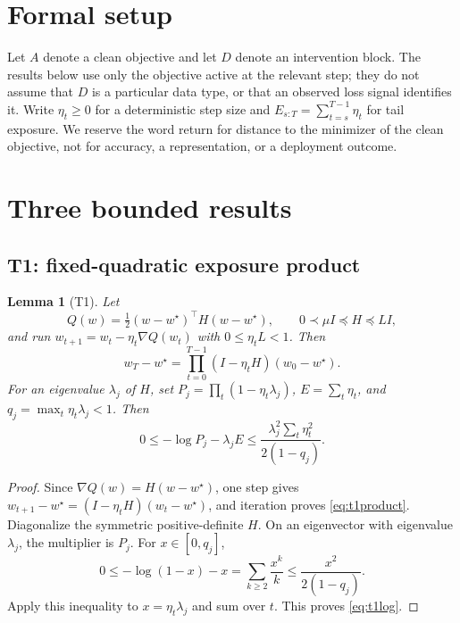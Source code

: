 \documentclass{article}
\newtheorem{lemma}{Lemma}
\begin{document}
\section{Formal setup}
\label{sec:setup}

Let $A$ denote a clean objective and let $D$ denote an intervention block.
The results below use only the objective active at the relevant step; they do
not assume that $D$ is a particular data type, or that an observed loss signal
identifies it. Write $\eta_t\geq0$ for a deterministic step size and
$E_{s:T}=\sum_{t=s}^{T-1}\eta_t$ for tail exposure. We reserve
the word return for distance to the minimizer of the clean objective, not for
accuracy, a representation, or a deployment outcome.

\section{Three bounded results}
\label{sec:theory}

\subsection{T1: fixed-quadratic exposure product}
\label{sec:t1}

\begin{lemma}[T1]
\label{thm:t1}
Let
\[
 Q(w)=\tfrac12(w-w^\star)^\top H(w-w^\star),\qquad
 0\prec\mu I\preceq H\preceq LI,
\]
and run $w_{t+1}=w_t-\eta_t\nabla Q(w_t)$ with
$0\leq\eta_tL<1$. Then
\begin{equation}
 w_T-w^\star=\prod_{t=0}^{T-1}(I-\eta_tH)(w_0-w^\star).
\label{eq:t1product}
\end{equation}
For an eigenvalue $\lambda_j$ of $H$, set
$P_j=\prod_t(1-\eta_t\lambda_j)$,
$E=\sum_t\eta_t$, and $q_j=\max_t\eta_t\lambda_j<1$. Then
\begin{equation}
 0\leq-\log P_j-\lambda_jE
 \leq\frac{\lambda_j^2\sum_t\eta_t^2}{2(1-q_j)}.
\label{eq:t1log}
\end{equation}
\end{lemma}

\begin{proof}
Since $\nabla Q(w)=H(w-w^\star)$, one step gives
$w_{t+1}-w^\star=(I-\eta_tH)(w_t-w^\star)$, and iteration proves
\eqref{eq:t1product}. Diagonalize the symmetric positive-definite $H$.
On an eigenvector with eigenvalue $\lambda_j$, the multiplier is $P_j$.
For $x\in[0,q_j]$,
\[
 0\leq-\log(1-x)-x
   =\sum_{k\geq2}\frac{x^k}{k}
 \leq\frac{x^2}{2(1-q_j)}.
\]
Apply this inequality to $x=\eta_t\lambda_j$ and sum over $t$.
This proves \eqref{eq:t1log}.
\end{proof}
\end{document}
